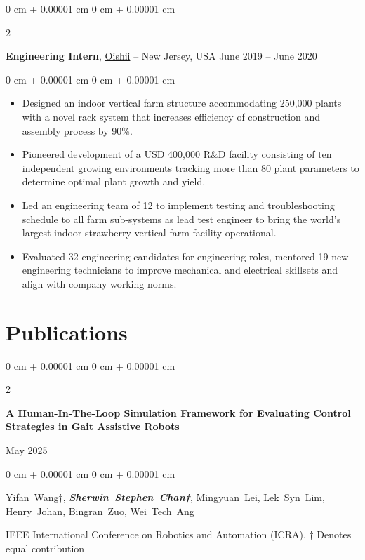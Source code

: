 \documentclass[10pt, letterpaper]{article}
\newenvironment{highlights}{
    \begin{itemize}[
        topsep=0.10 cm,
        parsep=0.10 cm,
        partopsep=0pt,
        itemsep=0pt,
        leftmargin=0 cm + 10pt
    ]
}{
    \end{itemize}
} %
\newenvironment{onecolentry}{
    \begin{adjustwidth}{
        0 cm + 0.00001 cm
    }{
        0 cm + 0.00001 cm
    }
}{
    \end{adjustwidth}
} %
\newenvironment{twocolentry}[2][]{
    \onecolentry
    \def\secondColumn{#2}
    \setcolumnwidth{\fill, 4.5 cm}
    \begin{paracol}{2}
}{
    \switchcolumn \raggedleft \secondColumn
    \end{paracol}
    \endonecolentry
} %
\begin{document}
        \vspace{0.2 cm}

        \begin{twocolentry}{
            June 2019 – June 2020
        }
            \textbf{Engineering Intern}, \href{https://oishii.com/}{Oishii} -- New Jersey, USA\end{twocolentry}

        \vspace{0.10 cm}
        \begin{onecolentry}
            \begin{highlights}
                \item Designed an indoor vertical farm structure accommodating 250,000 plants with a novel rack system that increases efficiency of construction and assembly process by 90\%.
                \item Pioneered development of a USD 400,000 R\&D facility consisting of ten independent growing environments tracking more than 80 plant parameters to determine optimal plant growth and yield.
                \item Led an engineering team of 12 to implement testing and troubleshooting schedule to all farm sub-systems as lead test engineer to bring the world’s largest indoor strawberry vertical farm facility operational.
                \item Evaluated 32 engineering candidates for engineering roles, mentored 19 new engineering technicians to improve mechanical and electrical skillsets and align with company working norms.
            \end{highlights}
        \end{onecolentry}



    
    \section{Publications}



        
        \begin{samepage}
            \begin{twocolentry}{
                May 2025
            }
                \textbf{A Human-In-The-Loop Simulation Framework for Evaluating Control Strategies in Gait Assistive Robots}
            \end{twocolentry}

            \vspace{0.10 cm}
            
            \begin{onecolentry}
                \mbox{Yifan Wang†}, \mbox{\textbf{\textit{Sherwin Stephen Chan†}}}, \mbox{Mingyuan Lei}, \mbox{Lek Syn Lim}, \mbox{Henry Johan}, \mbox{Bingran Zuo}, \mbox{Wei Tech Ang}

                \vspace{0.10 cm}
                
        IEEE International Conference on Robotics and Automation (ICRA), † Denotes equal contribution\end{onecolentry}
        \end{samepage}
\end{document}
